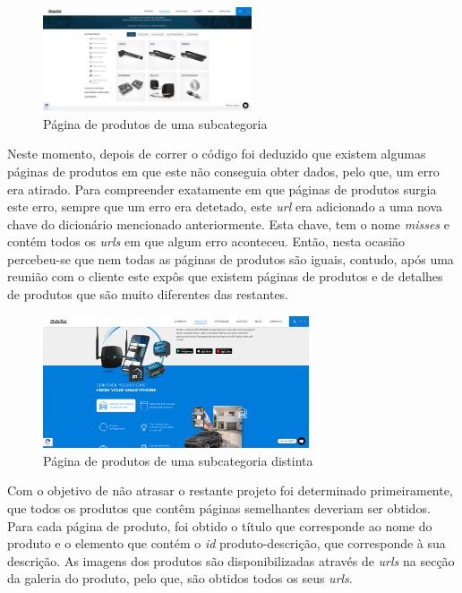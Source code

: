 \begin{figure}[htb]
  \centering
  
  \includegraphics[width=0.55\textwidth]{images/implementacao/scraper/pagina_produtos_subcat.png}
  \caption{Página de produtos de uma subcategoria}
  \label{fig:51}
\end{figure}

\newpage
Neste momento, depois de correr o código foi deduzido que existem algumas páginas de produtos em que este não conseguia obter dados, pelo que, um erro era atirado. Para compreender exatamente em que páginas de produtos surgia este erro, sempre que um erro era detetado, este \textit{url} era adicionado a uma nova chave do dicionário mencionado anteriormente. Esta chave, tem o nome \textit{misses} e contém todos os \textit{urls} em que algum erro aconteceu. Então, nesta ocasião percebeu-se que nem todas as páginas de produtos são iguais, contudo, após uma reunião com o cliente este expôs que existem páginas de produtos e de detalhes de produtos que são muito diferentes das restantes.

\begin{figure}[htb]
  \centering
  
  \includegraphics[width=0.7\textwidth]{images/implementacao/scraper/mconnect.png}
  \caption{Página de produtos de uma subcategoria distinta}
  \label{fig:52}
\end{figure}

Com o objetivo de não atrasar o restante projeto foi determinado primeiramente, que todos os produtos que contêm páginas semelhantes deveriam ser obtidos. Para cada página de produto, foi obtido o título que corresponde ao nome do produto e o elemento que contém o \textit{id} produto-descrição, que corresponde à sua descrição. As imagens dos produtos são disponibilizadas através de \textit{urls} na secção da galeria do produto, pelo que, são obtidos todos os seus \textit{urls}.

